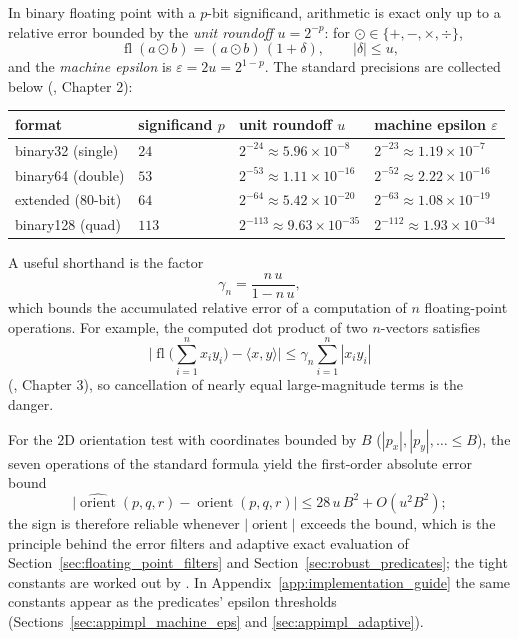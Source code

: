 In binary floating point with a $p$-bit significand, arithmetic is exact
only up to a relative error bounded by the \emph{unit roundoff}
$u = 2^{-p}$: for $\odot \in \{+, -, \times, \div\}$,
\[
  \operatorname{fl}(a \odot b) = (a \odot b)\,(1 + \delta),
  \qquad |\delta| \le u,
\]
and the \emph{machine epsilon} is $\varepsilon = 2u = 2^{1-p}$. The standard
precisions are collected below (\cite{higham2002}, Chapter 2):
\begin{center}
\begin{tabular}{llll}
\toprule
format & significand $p$ & unit roundoff $u$ & machine epsilon $\varepsilon$ \\
\midrule
binary32 (single)  & $24$  & $2^{-24} \approx 5.96\times10^{-8}$  & $2^{-23} \approx 1.19\times10^{-7}$ \\
binary64 (double)  & $53$  & $2^{-53} \approx 1.11\times10^{-16}$ & $2^{-52} \approx 2.22\times10^{-16}$ \\
extended (80-bit)  & $64$  & $2^{-64} \approx 5.42\times10^{-20}$ & $2^{-63} \approx 1.08\times10^{-19}$ \\
binary128 (quad)   & $113$ & $2^{-113} \approx 9.63\times10^{-35}$ & $2^{-112} \approx 1.93\times10^{-34}$ \\
\bottomrule
\end{tabular}
\end{center}

A useful shorthand is the factor
\[
  \gamma_n = \frac{n\,u}{1 - n\,u},
\]
which bounds the accumulated relative error of a computation of $n$
floating-point operations. For example, the computed dot product of two
$n$-vectors satisfies
\[
  \bigl|\operatorname{fl}\bigl(\textstyle\sum_{i=1}^n x_i y_i\bigr)
  - \langle x, y\rangle\bigr|
  \le \gamma_n \sum_{i=1}^n |x_i y_i|
\]
(\cite{higham2002}, Chapter 3), so cancellation of nearly equal
large-magnitude terms is the danger.

For the 2D orientation test with coordinates bounded by $B$
($|p_x|,|p_y|,\dots \le B$), the seven operations of the standard formula
yield the first-order absolute error bound
\[
  \bigl|\widehat{\operatorname{orient}}(p,q,r) - \operatorname{orient}(p,q,r)\bigr|
  \le 28\,u\,B^2 + O(u^2 B^2);
\]
the sign is therefore reliable whenever $|\operatorname{orient}|$ exceeds
the bound, which is the principle behind the error filters and adaptive
exact evaluation of Section~\ref{sec:floating_point_filters} and
Section~\ref{sec:robust_predicates}; the tight constants are worked out by
\cite{shewchuk1997}. In Appendix~\ref{app:implementation_guide} the same
constants appear as the predicates' epsilon thresholds
(Sections~\ref{sec:appimpl_machine_eps} and \ref{sec:appimpl_adaptive}).


